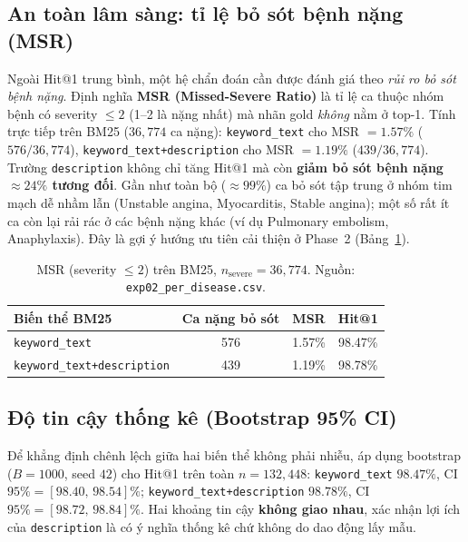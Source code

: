 \subsection{An toàn lâm sàng: tỉ lệ bỏ sót bệnh nặng (MSR)}
Ngoài Hit@1 trung bình, một hệ chẩn đoán cần được đánh giá theo \emph{rủi ro bỏ
    sót bệnh nặng}. Định nghĩa \textbf{MSR (Missed-Severe Ratio)} là tỉ lệ ca thuộc
nhóm bệnh có severity $\le 2$ (1--2 là nặng nhất) mà nhãn gold \emph{không} nằm ở
top-1. Tính trực tiếp trên BM25 ($36{,}774$ ca nặng):
\texttt{keyword\_text} cho MSR $=1.57\%$ ($576/36{,}774$),
\texttt{keyword\_text+description} cho MSR $=1.19\%$ ($439/36{,}774$).
Trường \texttt{description} không chỉ tăng Hit@1 mà còn \textbf{giảm bỏ sót bệnh
    nặng $\approx 24\%$ tương đối}. Gần như toàn bộ ($\approx 99\%$) ca bỏ sót tập
trung ở nhóm tim mạch dễ nhầm lẫn (Unstable angina, Myocarditis, Stable angina);
một số rất ít ca còn lại rải rác ở các bệnh nặng khác (ví dụ Pulmonary embolism,
Anaphylaxis). Đây là gợi ý hướng ưu tiên cải thiện ở Phase~2 (Bảng~\ref{tab:msr}).

\begin{table}[H]
    \centering
    \small
    \caption{MSR (severity $\le 2$) trên BM25, $n_{\text{severe}}=36{,}774$. Nguồn:
            \texttt{exp02\_per\_disease.csv}.}
    \label{tab:msr}
    \begin{tabular}{lccc}
        \hline
        \textbf{Biến thể BM25}             & \textbf{Ca nặng bỏ sót} & \textbf{MSR} & \textbf{Hit@1} \\
        \hline
        \texttt{keyword\_text}             & 576                     & 1.57\%       & 98.47\%        \\
        \texttt{keyword\_text+description} & 439                     & 1.19\%       & 98.78\%        \\
        \hline
    \end{tabular}
\end{table}

\subsection{Độ tin cậy thống kê (Bootstrap 95\% CI)}
Để khẳng định chênh lệch giữa hai biến thể không phải nhiễu, áp dụng bootstrap
($B=1000$, seed $42$) cho Hit@1 trên toàn $n=132{,}448$:
\texttt{keyword\_text} $98.47\%$, CI $95\%=[98.40,\,98.54]\%$;
\texttt{keyword\_text+description} $98.78\%$, CI $95\%=[98.72,\,98.84]\%$.
Hai khoảng tin cậy \textbf{không giao nhau}, xác nhận lợi ích của
\texttt{description} là có ý nghĩa thống kê chứ không do dao động lấy mẫu.

